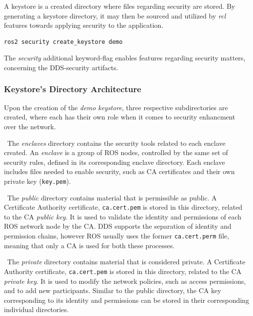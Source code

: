 A keystore is a created directory where files regarding security are stored. By generating a keystore directory, it may then be sourced and utilized by \textit{rcl} features towards applying security to the application.
            
\begin{lstlisting}[title={\textit{Keystore} creation using the proper SROS2 command.}]
ros2 security create_keystore demo
\end{lstlisting}

The \textit{security} additional keyword-flag enables features regarding security matters, concerning the DDS-security artifacts.

\subsubsection{Keystore's Directory Architecture}

Upon the creation of the \textit{demo keystore}, three respective subdirectories are created, where each has their own role when it comes to security enhancment over the network.

\textbullet\  The \textit{enclaves} directory contains the security tools related to each enclave created. An \textit{enclave} is a group of ROS nodes, controlled by the same set of security rules, defined in its corresponding enclave directory. Each enclave includes files needed to enable security, such as CA certificates and their own private key (\texttt{key.pem}). %

\textbullet\  The \textit{public} directory contains material that is permissible as public. A Certificate Authority certificate, \texttt{ca.cert.pem} is stored in this directory, related to the CA \textit{public key}. It is used to validate the identity and permissions of each ROS network node by the CA. DDS supports the separation of identity and permission chains, however ROS usually uses the former \texttt{ca.cert.perm} file, meaning that only a CA is used for both these processes.

\textbullet\  The \textit{private} directory contains material that is considered private. A Certificate Authority certificate, \texttt{ca.cert.pem} is stored in this directory, related to the CA \textit{private key}. It is used to modify the network policies, such as access permissions, and to add new participants. Similar to the public directory, the CA key corresponding to its identity and permissions can be stored in their corresponding individual directories.


